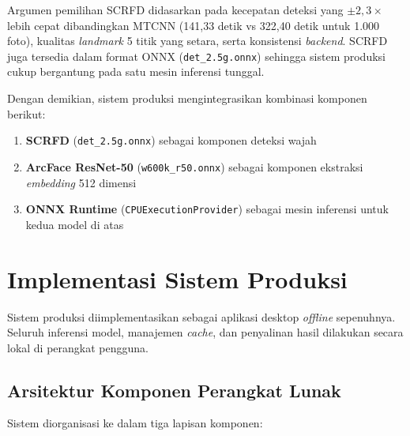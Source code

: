 Argumen pemilihan SCRFD didasarkan pada kecepatan deteksi yang $\pm 2{,}3\times$ lebih cepat dibandingkan MTCNN (141,33 detik vs 322,40 detik untuk 1.000 foto), kualitas \textit{landmark} 5 titik yang setara, serta konsistensi \textit{backend}. SCRFD juga tersedia dalam format ONNX (\texttt{det\_2.5g.onnx}) sehingga sistem produksi cukup bergantung pada satu mesin inferensi tunggal.

Dengan demikian, sistem produksi mengintegrasikan kombinasi komponen berikut:

\begin{enumerate}
    \item \textbf{SCRFD} (\texttt{det\_2.5g.onnx}) sebagai komponen deteksi wajah
    \item \textbf{ArcFace ResNet-50} (\texttt{w600k\_r50.onnx}) sebagai komponen ekstraksi \textit{embedding} 512 dimensi
    \item \textbf{ONNX Runtime} (\texttt{CPUExecutionProvider}) sebagai mesin inferensi untuk kedua model di atas
\end{enumerate}

\section{Implementasi Sistem Produksi}

Sistem produksi diimplementasikan sebagai aplikasi desktop \textit{offline} sepenuhnya. Seluruh inferensi model, manajemen \textit{cache}, dan penyalinan hasil dilakukan secara lokal di perangkat pengguna.

\subsection{Arsitektur Komponen Perangkat Lunak}

Sistem diorganisasi ke dalam tiga lapisan komponen:


